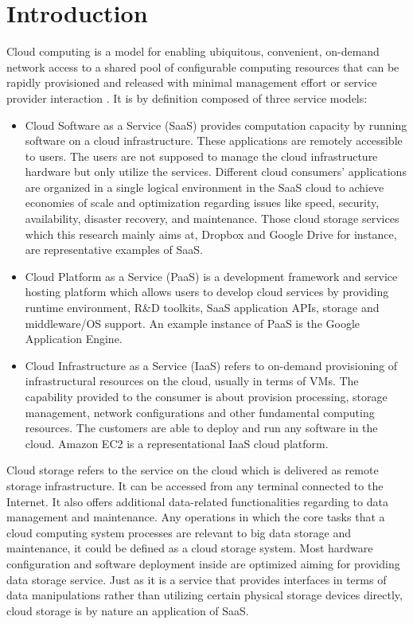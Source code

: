 \chapter{Introduction}
Cloud computing is a model for enabling ubiquitous, convenient, on-demand network access to a shared pool of configurable computing resources that can be rapidly provisioned and released with minimal management effort or service provider interaction \cite{Mell2011}. It is by definition composed of three service models:

\begin{itemize}
\item
Cloud Software as a Service (SaaS) provides computation capacity by running software on a cloud infrastructure. These applications are remotely accessible to users. The users are not supposed to manage the cloud infrastructure hardware but only utilize the services. Different cloud consumers' applications are organized in a single logical environment in the SaaS cloud to achieve economies of scale and optimization regarding issues like speed, security, availability, disaster recovery, and maintenance\cite{Mell2011}\cite{Dillon2010}. Those cloud storage services which this research mainly aims at, Dropbox and Google Drive for instance, are representative examples of SaaS.
\item
Cloud Platform as a Service (PaaS) is a development framework and service hosting platform which allows users to develop cloud services by providing runtime environment, R\&D toolkits, SaaS application APIs, storage and middleware/OS support. An example instance of PaaS is the Google Application Engine.
\item
Cloud Infrastructure as a Service (IaaS) refers to on-demand provisioning of infrastructural resources on the cloud, usually in terms of VMs\cite{Zhang2010}. The capability provided to the consumer is about provision processing, storage management, network configurations and other fundamental computing resources. The customers are able to deploy and run any software in the cloud\cite{Mell2011}\cite{Zhang2010}. Amazon EC2 is a representational IaaS cloud platform.
\end{itemize}
Cloud storage refers to the service on the cloud which is delivered as remote storage infrastructure. It can be accessed from any terminal connected to the Internet. It also offers additional data-related functionalities regarding to data management and maintenance\cite{Cachin2009}. Any operations in which the core tasks that a cloud computing system processes are relevant to big data storage and maintenance, it could be defined as a cloud storage system. Most hardware configuration and software deployment inside are optimized aiming for providing data storage service. Just as it is a service that provides interfaces in terms of data manipulations rather than utilizing certain physical storage devices directly, cloud storage is by nature an application of SaaS.


